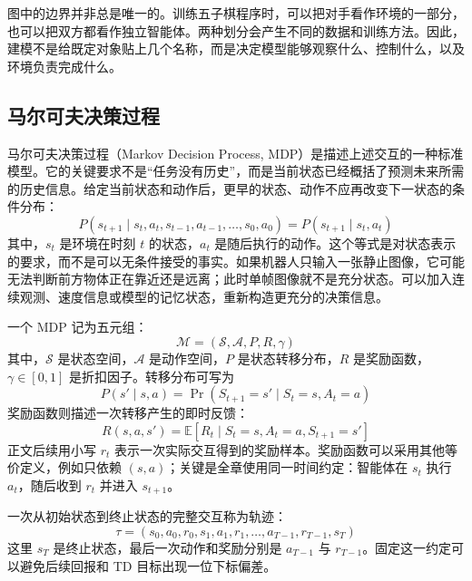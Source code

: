图中的边界并非总是唯一的。训练五子棋程序时，可以把对手看作环境的一部分，也可以把双方都看作独立智能体。两种划分会产生不同的数据和训练方法。因此，建模不是给既定对象贴上几个名称，而是决定模型能够观察什么、控制什么，以及环境负责完成什么。

\subsection{马尔可夫决策过程}

马尔可夫决策过程（Markov Decision Process, MDP）是描述上述交互的一种标准模型。它的关键要求不是“任务没有历史”，而是当前状态已经概括了预测未来所需的历史信息。给定当前状态和动作后，更早的状态、动作不应再改变下一状态的条件分布：
\begin{equation}
P(s_{t+1} \mid s_t, a_t, s_{t-1}, a_{t-1}, \ldots, s_0, a_0)
=
P(s_{t+1} \mid s_t, a_t)
\end{equation}
其中，\(s_t\) 是环境在时刻 \(t\) 的状态，\(a_t\) 是随后执行的动作。这个等式是对状态表示的要求，而不是可以无条件接受的事实。如果机器人只输入一张静止图像，它可能无法判断前方物体正在靠近还是远离；此时单帧图像就不是充分状态。可以加入连续观测、速度信息或模型的记忆状态，重新构造更充分的决策信息。

一个 MDP 记为五元组：
\begin{equation}
\mathcal{M} = (\mathcal{S}, \mathcal{A}, P, R, \gamma)
\end{equation}
其中，\(\mathcal{S}\) 是状态空间，\(\mathcal{A}\) 是动作空间，\(P\) 是状态转移分布，\(R\) 是奖励函数，\(\gamma\in[0,1]\) 是折扣因子。转移分布可写为
\begin{equation}
P(s'\mid s,a)=\Pr(S_{t+1}=s'\mid S_t=s,A_t=a)
\end{equation}
奖励函数则描述一次转移产生的即时反馈：
\begin{equation}
R(s,a,s')=\mathbb{E}[R_t\mid S_t=s,A_t=a,S_{t+1}=s']
\end{equation}
正文后续用小写 \(r_t\) 表示一次实际交互得到的奖励样本。奖励函数可以采用其他等价定义，例如只依赖 \((s,a)\)；关键是全章使用同一时间约定：智能体在 \(s_t\) 执行 \(a_t\)，随后收到 \(r_t\) 并进入 \(s_{t+1}\)。

一次从初始状态到终止状态的完整交互称为轨迹：
\begin{equation}
\tau=(s_0,a_0,r_0,s_1,a_1,r_1,\ldots,a_{T-1},r_{T-1},s_T)
\end{equation}
这里 \(s_T\) 是终止状态，最后一次动作和奖励分别是 \(a_{T-1}\) 与 \(r_{T-1}\)。固定这一约定可以避免后续回报和 TD 目标出现一位下标偏差。

